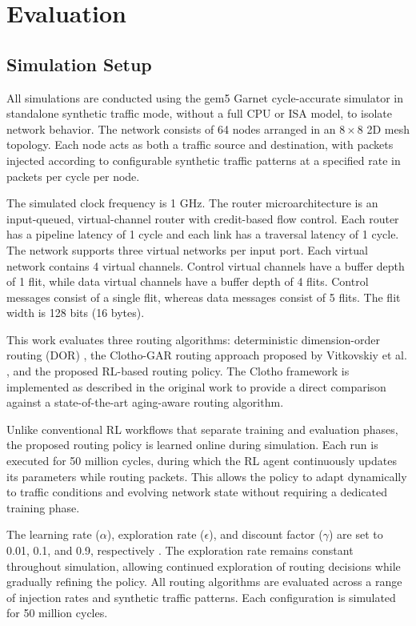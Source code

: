 \chapter{Evaluation}

\section{Simulation Setup}

All simulations are conducted using the gem5 Garnet cycle-accurate simulator \cite{gem5} \cite{lowepower2020gem5simulatorversion200} in standalone synthetic traffic mode, without a full CPU or ISA model, to isolate network behavior. The network consists of 64 nodes arranged in an $8 \times 8$ 2D mesh topology. Each node acts as both a traffic source and destination, with packets injected according to configurable synthetic traffic patterns at a specified rate in packets per cycle per node.

The simulated clock frequency is 1 GHz. The router microarchitecture is an input-queued, virtual-channel router with credit-based flow control. Each router has a pipeline latency of 1 cycle and each link has a traversal latency of 1 cycle. The network supports three virtual networks per input port. Each virtual network contains 4 virtual channels. Control virtual channels have a buffer depth of 1 flit, while data virtual channels have a buffer depth of 4 flits. Control messages consist of a single flit, whereas data messages consist of 5 flits. The flit width is 128 bits (16 bytes).

This work evaluates three routing algorithms: deterministic dimension-order routing (DOR) \cite{Zhang2009}, the Clotho-GAR routing approach proposed by Vitkovskiy et al. \cite{Clotho2015}, and the proposed RL-based routing policy. The Clotho framework is implemented as described in the original work to provide a direct comparison against a state-of-the-art aging-aware routing algorithm.

Unlike conventional RL workflows that separate training and evaluation phases, the proposed routing policy is learned online during simulation. Each run is executed for 50 million cycles, during which the RL agent continuously updates its parameters while routing packets. This allows the policy to adapt dynamically to traffic conditions and evolving network state without requiring a dedicated training phase.

The learning rate ($\alpha$), exploration rate ($\epsilon$), and discount factor ($\gamma$) are set to 0.01, 0.1, and 0.9, respectively \cite{LARE2023}. The exploration rate remains constant throughout simulation, allowing continued exploration of routing decisions while gradually refining the policy. All routing algorithms are evaluated across a range of injection rates and synthetic traffic patterns. Each configuration is simulated for 50 million cycles.

